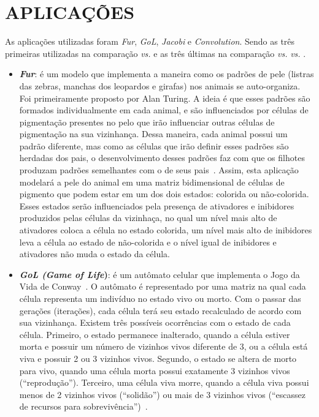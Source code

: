 \section{APLICAÇÕES}
\label{sec:aplicacoes}

As aplicações utilizadas foram \textit{Fur}, \textit{GoL}, \textit{Jacobi} e \textit{Convolution}. Sendo as três primeiras utilizadas na comparação \async \textit{vs.} \ipc e as três últimas na comparação \async \textit{vs.} \gpu \textit{vs.} \cpu.

\begin{itemize}
  \item \textbf{\textit{Fur}}: é um modelo que implementa a maneira como os padrões de pele (listras das zebras, manchas dos leopardos e girafas) nos animais se auto-organiza. Foi primeiramente proposto por Alan Turing. A ideia é que esses padrões são formados individualmente em cada animal, e são influenciados por células de pigmentação presentes no pelo que irão influenciar outras células de pigmentação na sua vizinhança. Dessa maneira, cada animal possui um padrão diferente, mas como as células que irão definir esses padrões são herdadas dos pais, o desenvolvimento desses padrões faz com que os filhotes produzam padrões semelhantes com o de seus pais~\cite{NetLogoFur}. Assim, esta aplicação modelará a pele do animal em uma matriz bidimensional de células de pigmento que podem estar em um dos dois estados: colorida ou não-colorida. Esses estados serão influenciados pela presença de ativadores e inibidores produzidos pelas células da vizinhaça, no qual um nível mais alto de ativadores coloca a célula no estado colorida, um nível mais alto de inibidores leva a célula ao estado de não-colorida e o nível igual de inibidores e ativadores não muda o estado da célula.

  \item \textbf{\textit{GoL (Game of Life})}: é um autômato celular que implementa o Jogo da Vida de Conway~\cite{gardner70}. O autômato é representado por uma matriz na qual cada célula representa um indivíduo no estado vivo ou morto. Com o passar das gerações (iterações), cada célula terá seu estado recalculado de acordo com sua vizinhança. Existem três possíveis ocorrências com o estado de cada célula. Primeiro, o estado permanece inalterado, quando a célula estiver morta e possuir um número de vizinhos vivos diferente de 3, ou a célula está viva e possuir 2 ou 3 vizinhos vivos. Segundo, o estado se altera de morto para vivo, quando uma célula morta possui exatamente 3 vizinhos vivos (``reprodução''). Terceiro, uma célula viva morre, quando a célula viva possui menos de 2 vizinhos vivos (``solidão'') ou mais de 3 vizinhos vivos (``escassez de recursos para sobrevivência'')~\cite{CPE:CPE3479}. 
  

\end{itemize}
